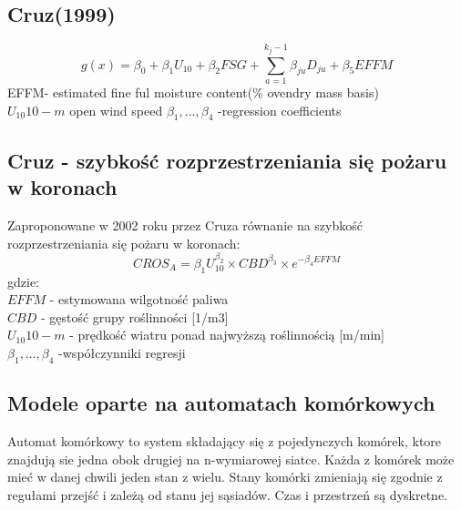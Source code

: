 \documentclass[a4paper, 11pt]{article}
\begin{document}
	\subsection{Cruz(1999)}
	$$
	g(x)=\beta_0+\beta_{1}U_10+\beta_{2}FSG+ \sum\limits_{a=1}^{k_j -1}\beta_{ju}D_{ju}+\beta_5EFFM
	$$
	EFFM- estimated fine ful moisture content(\% ovendry mass basis)\\
	$U_10  10-m$ open wind speed
	$\beta_1, ...,\beta_4$ -regression coefficients
	\fi
	\subsection{Cruz - szybkość rozprzestrzeniania się pożaru w koronach}
	\indent
	Zaproponowane w 2002 roku przez Cruza równanie na szybkość rozprzestrzeniania się pożaru w koronach: 
	$$
	CROS_A=\beta_1U^{\beta_2}_10 \times CBD^{\beta_3} \times e^{-\beta_4EFFM}
	$$
	gdzie: \\
	$EFFM$ - estymowana wilgotność paliwa \\
	$CBD$ - gęstość grupy roślinności [1/m3]\\
	$U_10  10-m$ - prędkość wiatru ponad najwyższą roślinnością [m/min]\\
	$\beta_1, ...,\beta_4$ -współczynniki regresji\\
	\subsection{Modele oparte na automatach komórkowych}	
	\indent
	
	Automat komórkowy to system składający się z pojedynczych komórek, ktore znajdują sie jedna obok drugiej na n-wymiarowej siatce. Każda z komórek może mieć w danej chwili jeden stan z wielu. Stany komórki zmieniają się zgodnie z regułami przejść i zależą od stanu jej sąsiadów. Czas i przestrzeń są dyskretne.\\
	
\end{document}

